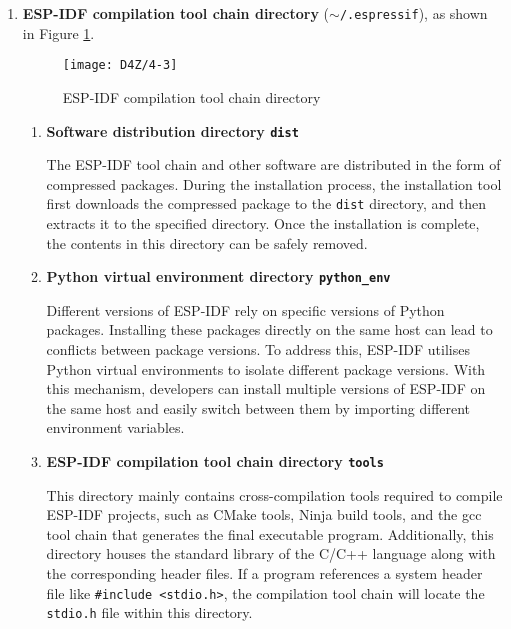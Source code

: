 \documentclass[a4paper,12pt]{book}
\begin{document}
\begin{enumerate}[label=(\arabic*),leftmargin=2em]
    \item \textbf{ESP-IDF compilation tool chain directory} (\texttt{$\sim$/.espressif}), as shown in Figure \ref{ESP-IDF compilation tool chain directory}.

    \begin{figure}[h!]
        \centering
        \texttt{[image: D4Z/4-3]}
        \caption{ESP-IDF compilation tool chain directory}
        \label{ESP-IDF compilation tool chain directory}
    \end{figure}

    \begin{enumerate}[label=\textbf{\alph*.},leftmargin=0em]
        \item \textbf{Software distribution directory \texttt{dist}}

        The ESP-IDF tool chain and other software are distributed in the form of compressed packages. During the installation process, the installation tool first downloads the compressed package to the \verb|dist| directory, and then extracts it to the specified directory. Once the installation is complete, the contents in this directory can be safely removed.

        \item \textbf{Python virtual environment directory \texttt{python\_env}}

        Different versions of ESP-IDF rely on specific versions of Python packages. Installing these packages directly on the same host can lead to conflicts between package versions. To address this, ESP-IDF utilises Python virtual environments to isolate different package versions. With this mechanism, developers can install multiple versions of ESP-IDF on the same host and easily switch between them by importing different environment variables.

        \item \textbf{ESP-IDF compilation tool chain directory \texttt{tools}}

        This directory mainly contains cross-compilation tools required to compile ESP-IDF projects, such as CMake tools, Ninja build tools, and the gcc tool chain that generates the final executable program. Additionally, this directory houses the standard library of the C/C++ language along with the corresponding header files. If a program references a system header file like \verb|#include <stdio.h>|, the compilation tool chain will locate the \verb|stdio.h| file within this directory.
    \end{enumerate}
\end{enumerate}
\end{document}
